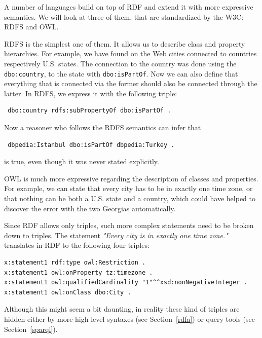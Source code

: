 A number of languages build on top of RDF and extend it with more expressive semantics.
We will look at three of them, that are standardized by the W3C: RDFS and OWL. %

RDFS is the simplest one of them.
It allows us to describe class and property hierarchies.
For example, we have found on the Web cities connected to countries respectively U.S. states.
The connection to the country was done using the \texttt{dbo:country}, to the state with \texttt{dbo:isPartOf}.
Now we can also define that everything that is connected via the former should also be connected through the latter.
In RDFS, we express it with the following triple:

\begin{verbatim}
 dbo:country rdfs:subPropertyOf dbo:isPartOf .
\end{verbatim}

Now a reasoner who follows the RDFS semantics can infer that

\begin{verbatim}
 dbpedia:Istanbul dbo:isPartOf dbpedia:Turkey .
\end{verbatim}

is true, even though it was never stated explicitly.

OWL is much more expressive regarding the description of classes and properties.
For example, we can state that every city has to be in exactly one time zone, or that nothing can be both a U.S. state and a country, which could have helped to discover the error with the two Georgias automatically.

Since RDF allows only triples, such more complex statements need to be broken down to triples.
The statement \textit{"Every city is in exactly one time zone."} translates in RDF to the following four triples:

\begin{verbatim}
x:statement1 rdf:type owl:Restriction .
x:statement1 owl:onProperty tz:timezone .
x:statement1 owl:qualifiedCardinality "1"^^xsd:nonNegativeInteger .
x:statement1 owl:onClass dbo:City .
\end{verbatim}

Although this might seem a bit daunting, in reality these kind of triples are hidden either by more high-level syntaxes (see Section~\ref{rdfa}) or query tools (see Section~\ref{sparql}).


